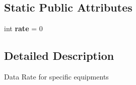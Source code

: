 \subsection*{Static Public Attributes}
\begin{DoxyCompactItemize}
\item 
\hypertarget{classmininet_1_1wifiDevices_1_1deviceDataRate_a842f913dc88098b3c8c8b0b0120b9df2}{int {\bfseries rate} = 0}\label{classmininet_1_1wifiDevices_1_1deviceDataRate_a842f913dc88098b3c8c8b0b0120b9df2}

\end{DoxyCompactItemize}


\subsection{Detailed Description}
\begin{DoxyVerb}Data Rate for specific equipments \end{DoxyVerb}
 


